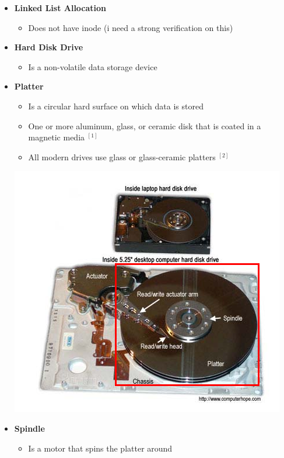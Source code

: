 \documentclass[12pt]{article}
\begin{document}
\begin{itemize}
    \item \textbf{Linked List Allocation}

    \begin{itemize}
        \item Does not have inode (i need a strong verification on this)
    \end{itemize}

    \item \textbf{Hard Disk Drive}

    \begin{itemize}
        \item Is a non-volatile data storage device
    \end{itemize}

    \item \textbf{Platter}

    \begin{itemize}
        \item Is a circular hard surface on which data is stored
        \item One or more aluminum, glass, or ceramic disk that
    is coated in a magnetic media $^{[1]}$
        \item All modern drives use glass or glass-ceramic platters $^{[2]}$
    \end{itemize}

    \begin{center}
        \includegraphics[width=0.5\linewidth]{../images/midterm_4_solution_49.png}
    \end{center}

    \item \textbf{Spindle}

    \begin{itemize}
        \item Is a motor that spins the platter around
    \end{itemize}


\end{itemize}
\end{document}

